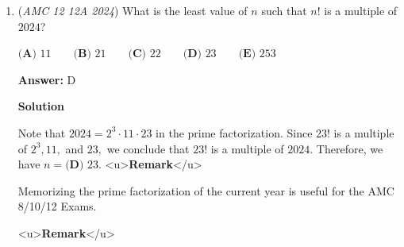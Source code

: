 \begin{enumerate}
Since we want the least number of two-digit numbers, we maximize the two-digit numbers by choosing as many $99$s as possible. Since $2024=99\cdot20+44\cdot1,$ we choose twenty $99$s and one $44,$ for a total of $\boxed{\textbf{(B) }21}$ two-digit numbers.

 



\textbf{Solution 2}

We claim the answer is $21$. This can be achieved by adding twenty $99$'s and a $44$. To prove that the answer cannot be less than or equal to $20$, we note that the maximum value of the sum of $20$ or less two digit numbers is $20 \cdot 99 = 1980$, which is smaller than $2024$, so we are done. Thus, the answer is $\boxed{\textbf{(B) }21}$.

 



\textbf{Solution 3 (Same as Solution 1 but Using 100=99+1)}

$2024=100\cdot20+24$. Since $100=99+1$, $2024=(99+1)\cdot20+24=99\cdot20+1\cdot20+24=99\cdot20+44$. Therefore a total of $\boxed{\textbf{(B) }21}$ two-digit numbers are needed.

 



\textbf{Solution 4}

The maximum $2$-digit number is $99$, but try $100$. $2024 \div 100$ is a little more than $20$, and the remainder is less than $100$, by intuition, so there's $20 +$ the remainder $1 = \boxed{\textbf{(B) }21}$.

 


	\item (\textit{AMC 12 12A 2024}) What is the least value of $n$ such that $n!$ is a multiple of $2024$?


 $\textbf{(A) }11 \qquad \textbf{(B) }21 \qquad \textbf{(C) }22 \qquad \textbf{(D) }23 \qquad \textbf{(E) }253 \qquad$

 \textbf{Answer: }D



\textbf{Solution}

Note that $2024=2^3\cdot11\cdot23$ in the prime factorization. Since $23!$ is a multiple of $2^3, 11,$ and $23,$ we conclude that $23!$ is a multiple of $2024.$ Therefore, we have $n=\boxed{\textbf{(D) } 23}.$
<u>\textbf{Remark}</u>

 Memorizing the prime factorization of the current year is useful for the AMC 8/10/12 Exams.

 <u>\textbf{Remark}</u>


\end{enumerate}
